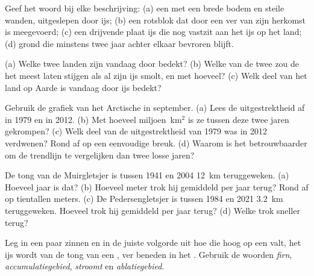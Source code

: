 \begin{exercise}[$\star$]\label{exo:g8:ice-on-earth:3}
Geef het woord bij elke beschrijving: (a) een  met een brede bodem en
steile wanden, uitgeslepen door ijs; (b) een rotsblok dat door een
 ver van zijn herkomst is meegevoerd; (c) een drijvende plaat ijs
die nog vastzit aan het ijs op het land; (d) grond die minstens twee jaar
achter elkaar bevroren blijft.
\end{exercise}

\begin{exercise}[$\star$]\label{exo:g8:ice-on-earth:4}
(a) Welke twee landen zijn vandaag door  bedekt? (b) Welke van de
twee zou de  het meest laten stijgen als al zijn ijs smolt, en met
hoeveel? (c) Welk deel van het land op Aarde is vandaag door ijs bedekt?
\end{exercise}

\begin{exercise}[$\star\star$]\label{exo:g8:ice-on-earth:5}
Gebruik de grafiek van het Arctische  in september. (a) Lees de
uitgestrektheid af in 1979 en in 2012. (b) Met hoeveel miljoen~km$^2$ is
ze tussen deze twee jaren gekrompen? (c) Welk deel van de uitgestrektheid
van 1979 was in 2012 verdwenen? Rond af op een eenvoudige breuk.
(d) Waarom is het betrouwbaarder om de trendlijn te vergelijken dan twee
losse jaren?
\end{exercise}

\begin{exercise}[$\star\star$]\label{exo:g8:ice-on-earth:6}
De tong van de Muirgletsjer is tussen 1941 en 2004 \qty{12}{km}
teruggeweken. (a) Hoeveel jaar is dat? (b) Hoeveel meter trok hij
gemiddeld per jaar terug? Rond af op tientallen meters. (c) De
Pedersengletsjer is tussen 1984 en 2021 \qty{3.2}{km} teruggeweken.
Hoeveel trok hij gemiddeld per jaar terug? (d) Welke  trok sneller
terug?
\end{exercise}

\begin{exercise}[$\star\star$]\label{exo:g8:ice-on-earth:7}
Leg in een paar zinnen en in de juiste volgorde uit hoe  die hoog op
een  valt, het ijs wordt van de tong van een , ver beneden in
het . Gebruik de woorden \emph{firn}, \emph{accumulatiegebied},
\emph{stroomt} en \emph{ablatiegebied}.
\end{exercise}

